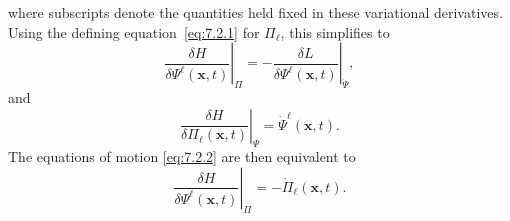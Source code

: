 where subscripts denote the quantities held fixed in these variational
derivatives. Using the defining equation~\eqref{eq:7.2.1} for $\Pi_\ell$, this simplifies to
\begin{equation}
\left.\frac{\delta H}{\delta\Psi^\ell(\mathbf{x},t)}\right|_{\Pi}
=-\left.\frac{\delta L}{\delta\Psi^\ell(\mathbf{x},t)}\right|_{\dot\Psi},
\tag{7.2.11}\label{eq:7.2.11}
\end{equation}
and
\begin{equation}
\left.\frac{\delta H}{\delta\Pi_\ell(\mathbf{x},t)}\right|_{\Psi}
=\dot\Psi^\ell(\mathbf{x},t).
\tag{7.2.12}\label{eq:7.2.12}
\end{equation}
The equations of motion \eqref{eq:7.2.2} are then equivalent to
\begin{equation}
\left.\frac{\delta H}{\delta\Psi^\ell(\mathbf{x},t)}\right|_{\Pi}
=-\dot\Pi_\ell(\mathbf{x},t).
\tag{7.2.13}\label{eq:7.2.13}
\end{equation}

